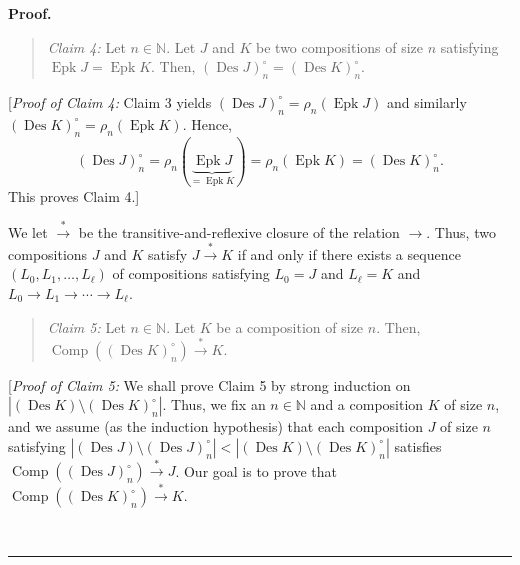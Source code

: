 \documentclass[numbers=enddot,12pt,final,onecolumn,notitlepage]{scrartcl}%
\theoremstyle{definition}
\newenvironment{statement}{\begin{quote}}{\end{quote}}
\newenvironment{proof}[1][Proof]{\noindent\textbf{#1.} }{\ \rule{0.5em}{0.5em}}
\newenvironment{verlong}{}{}
\begin{document}
\begin{verlong}
\begin{proof}
\begin{statement}
\textit{Claim 4:} Let $n\in\mathbb{N}$. Let $J$ and $K$ be two compositions of
size $n$ satisfying $\operatorname*{Epk}J=\operatorname*{Epk}K$. Then,
$\left(  \operatorname*{Des}J\right)  _{n}^{\circ}=\left(  \operatorname*{Des}%
K\right)  _{n}^{\circ}$.
\end{statement}

[\textit{Proof of Claim 4:} Claim 3 yields $\left(  \operatorname*{Des}%
J\right)  _{n}^{\circ}=\rho_{n}\left(  \operatorname*{Epk}J\right)  $ and
similarly $\left(  \operatorname*{Des}K\right)  _{n}^{\circ}=\rho_{n}\left(
\operatorname*{Epk}K\right)  $. Hence,%
\[
\left(  \operatorname*{Des}J\right)  _{n}^{\circ}=\rho_{n}\left(
\underbrace{\operatorname*{Epk}J}_{=\operatorname*{Epk}K}\right)  =\rho
_{n}\left(  \operatorname*{Epk}K\right)  =\left(  \operatorname*{Des}K\right)
_{n}^{\circ}.
\]
This proves Claim 4.]

We let $\overset{\ast}{\rightarrow}$ be the transitive-and-reflexive closure
of the relation $\rightarrow$. Thus, two compositions $J$ and $K$ satisfy
$J\overset{\ast}{\rightarrow}K$ if and only if there exists a sequence
$\left(  L_{0},L_{1},\ldots,L_{\ell}\right)  $ of compositions satisfying
$L_{0}=J$ and $L_{\ell}=K$ and $L_{0}\rightarrow L_{1}\rightarrow
\cdots\rightarrow L_{\ell}$.

\begin{statement}
\textit{Claim 5:} Let $n\in\mathbb{N}$. Let $K$ be a composition of size $n$.
Then, $\operatorname*{Comp}\left(  \left(  \operatorname*{Des}K\right)
_{n}^{\circ}\right)  \overset{\ast}{\rightarrow}K$.
\end{statement}

[\textit{Proof of Claim 5:} We shall prove Claim 5 by strong induction on
$\left\vert \left(  \operatorname*{Des}K\right)  \setminus\left(
\operatorname*{Des}K\right)  _{n}^{\circ}\right\vert $. Thus, we fix an
$n\in\mathbb{N}$ and a composition $K$ of size $n$, and we assume (as the
induction hypothesis) that each composition $J$ of size $n$ satisfying
$\left\vert \left(  \operatorname*{Des}J\right)  \setminus\left(
\operatorname*{Des}J\right)  _{n}^{\circ}\right\vert <\left\vert \left(
\operatorname*{Des}K\right)  \setminus\left(  \operatorname*{Des}K\right)
_{n}^{\circ}\right\vert $ satisfies $\operatorname*{Comp}\left(  \left(
\operatorname*{Des}J\right)  _{n}^{\circ}\right)  \overset{\ast}{\rightarrow
}J$. Our goal is to prove that $\operatorname*{Comp}\left(  \left(
\operatorname*{Des}K\right)  _{n}^{\circ}\right)  \overset{\ast}{\rightarrow
}K$.


\end{proof}
\end{verlong}
\end{document}
